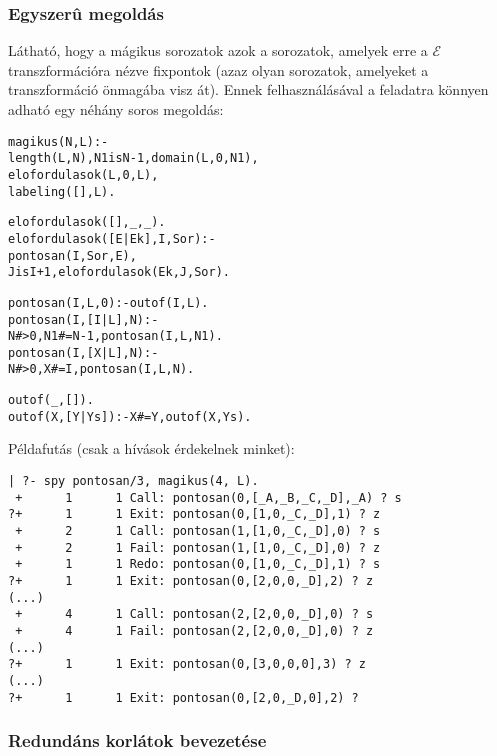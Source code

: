 \subsubsection{Egyszerû \clpfd megoldás}

Látható, hogy a mágikus sorozatok azok a sorozatok, amelyek erre a $\mathcal{E}$
transzformációra nézve fixpontok (azaz olyan sorozatok, amelyeket a transzformáció
önmagába visz át). Ennek felhasználásával a feladatra könnyen adható egy néhány
soros \clpfd megoldás:

\begin{alltt}
% Az L lista egy N hosszúságú mágikus sorozat.
magikus(N, L) :-
        length(L, N), N1 is N-1, domain(L, 0, N1),
        elofordulasok(L, 0, L),
        labeling([], L).             % most felesleges

% elofordulasok([E\(_\cd{i}\), E\(_\cd{i+1}\), \ldots], i, Sor): Sor-ban az i
% szám E\(_\cd{i}\)-szer, az i+1 szám E\(_\cd{i+1}\)-szer stb. fordul elõ.
% Ez a predikátum valósítja meg a fenti elõfordulás-sorozat transzformációt
elofordulasok([], _, _).
elofordulasok([E|Ek], I, Sor) :-
        pontosan(I, Sor, E), 
        J is I+1, elofordulasok(Ek, J, Sor).

% pontosan(I, L, E): Az I szám L-ben E-szer fordul elõ.
pontosan(I, L, 0) :- outof(I, L).
pontosan(I, [I|L], N) :- 
        N #> 0, N1 #= N-1, pontosan(I, L, N1).
pontosan(I, [X|L], N) :- 
        N #> 0, X #\bs= I, pontosan(I, L, N).

% outof(I, L): Az I szám L-ben nem fordul elõ.
outof(_, []).
outof(X, [Y|Ys]) :- X #\bs= Y, outof(X, Ys).
\end{alltt}

Példafutás (csak a  hívások érdekelnek minket):

\begin{verbatim}
| ?- spy pontosan/3, magikus(4, L).
 +      1      1 Call: pontosan(0,[_A,_B,_C,_D],_A) ? s
?+      1      1 Exit: pontosan(0,[1,0,_C,_D],1) ? z
 +      2      1 Call: pontosan(1,[1,0,_C,_D],0) ? s
 +      2      1 Fail: pontosan(1,[1,0,_C,_D],0) ? z
 +      1      1 Redo: pontosan(0,[1,0,_C,_D],1) ? s
?+      1      1 Exit: pontosan(0,[2,0,0,_D],2) ? z
(...)
 +      4      1 Call: pontosan(2,[2,0,0,_D],0) ? s
 +      4      1 Fail: pontosan(2,[2,0,0,_D],0) ? z
(...)
?+      1      1 Exit: pontosan(0,[3,0,0,0],3) ? z
(...)
?+      1      1 Exit: pontosan(0,[2,0,_D,0],2) ?
\end{verbatim}

\subsubsection{Redundáns korlátok bevezetése}

